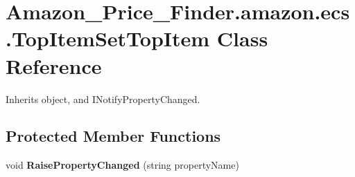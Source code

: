 \hypertarget{class_amazon___price___finder_1_1amazon_1_1ecs_1_1_top_item_set_top_item}{\section{Amazon\-\_\-\-Price\-\_\-\-Finder.\-amazon.\-ecs.\-Top\-Item\-Set\-Top\-Item Class Reference}
\label{class_amazon___price___finder_1_1amazon_1_1ecs_1_1_top_item_set_top_item}
}


 




Inherits object, and I\-Notify\-Property\-Changed.

\subsection*{Protected Member Functions}
\begin{DoxyCompactItemize}
\item 
\hypertarget{class_amazon___price___finder_1_1amazon_1_1ecs_1_1_top_item_set_top_item_a8b6f1a63bb66b3cc9f48999c21d56b53}{void {\bfseries Raise\-Property\-Changed} (string property\-Name)}\label{class_amazon___price___finder_1_1amazon_1_1ecs_1_1_top_item_set_top_item_a8b6f1a63bb66b3cc9f48999c21d56b53}

\end{DoxyCompactItemize}
